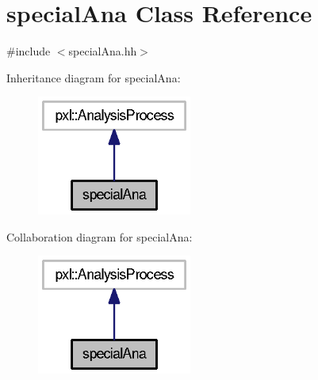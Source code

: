 \section{special\-Ana Class Reference}
\label{classspecialAna}


{\ttfamily \#include $<$special\-Ana.\-hh$>$}



Inheritance diagram for special\-Ana\-:\nopagebreak
\begin{figure}[H]
\begin{center}
\leavevmode
\includegraphics[width=144pt]{classspecialAna__inherit__graph}
\end{center}
\end{figure}


Collaboration diagram for special\-Ana\-:\nopagebreak
\begin{figure}[H]
\begin{center}
\leavevmode
\includegraphics[width=144pt]{classspecialAna__coll__graph}
\end{center}
\end{figure}
